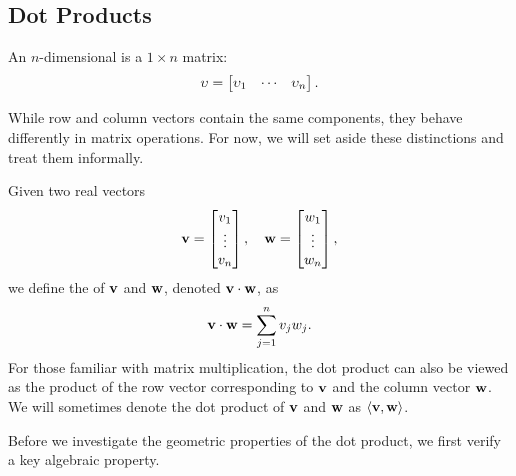 \subsection{Dot Products}
\begin{dfn}
An \( n \)-dimensional  is a \( 1 \times n \) matrix:
\[
    \vb{\upsilon} = \begin{bmatrix}
        \upsilon_1 & \cdots & \upsilon_n
    \end{bmatrix}.
\]
\end{dfn}

While row and column vectors contain the same components, they behave differently in matrix operations. For now, we will set aside these distinctions and treat them informally.

\begin{dfn}
Given two real vectors 
\[
    \vb{v}=  \begin{bmatrix}
        v_1 \\
        \vdots \\
        v_n
    \end{bmatrix}, \quad
    \vb{w} =  \begin{bmatrix}
        w_1 \\
        \vdots \\
        w_n
    \end{bmatrix},
\]
we define the  of \( \vb{v} \) and \( \vb{w} \), denoted \( \vb{v} \cdot \vb{w} \), as
\[
    \vb{v} \cdot \vb{w} = \sum_{j=1}^{n} v_j w_j.
\]
For those familiar with matrix multiplication, the dot product can also be viewed as the product of the row vector corresponding to \( \vb{v} \) and the column vector \( \vb{w} \). \\
We will sometimes denote the dot product of \( \vb{v} \) and \( \vb{w} \) as \( \left< \vb{v}, \vb{w} \right> \).
\end{dfn}

Before we investigate the geometric properties of the dot product, we first verify a key algebraic property.

